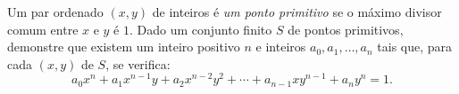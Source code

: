 Um par ordenado $(x, y)$ de inteiros é \emph{um ponto primitivo} se o máximo divisor comum entre $x$ e $y$ é $1$. Dado um conjunto finito $S$ de pontos primitivos, demonstre que existem um inteiro positivo $n$ e inteiros $a_0, a_1, \ldots , a_n$ tais que, para cada $(x, y)$ de $S$, se verifica:
\[a_0x^n + a_1x^{n-1} y + a_2x^{n-2}y^2 + \cdots + a_{n-1}xy^{n-1} + a_ny^n = 1.\]
